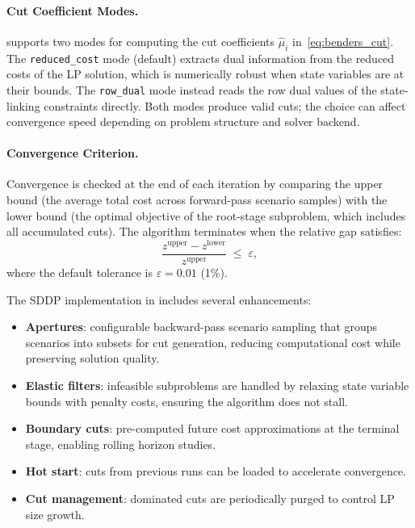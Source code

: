 \paragraph{Cut Coefficient Modes.}
\gtopt{} supports two modes for computing the cut coefficients
$\hat{\mu}_i$ in~\eqref{eq:benders_cut}.  The \texttt{reduced\_cost}
mode (default) extracts dual information from the reduced costs of the
LP solution, which is numerically robust when state variables are at
their bounds.  The \texttt{row\_dual} mode instead reads the row dual
values of the state-linking constraints directly.  Both modes produce
valid cuts; the choice can affect convergence speed depending on problem
structure and solver backend.

\paragraph{Convergence Criterion.}
Convergence is checked at the end of each iteration by comparing the
upper bound (the average total cost across forward-pass scenario
samples) with the lower bound (the optimal objective of the root-stage
subproblem, which includes all accumulated cuts).  The algorithm
terminates when the relative gap satisfies:
\[
  \frac{z^{\text{upper}} - z^{\text{lower}}}{z^{\text{upper}}}
  \;\leq\; \varepsilon,
\]
where the default tolerance is $\varepsilon = 0.01$ (1\%).

The SDDP implementation in \gtopt{} includes several enhancements:

\begin{itemize}
  \item \textbf{Apertures}: configurable backward-pass scenario sampling
    that groups scenarios into subsets for cut generation, reducing
    computational cost while preserving solution quality.
  \item \textbf{Elastic filters}: infeasible subproblems are handled by
    relaxing state variable bounds with penalty costs, ensuring the
    algorithm does not stall.
  \item \textbf{Boundary cuts}: pre-computed future cost approximations
    at the terminal stage, enabling rolling horizon studies.
  \item \textbf{Hot start}: cuts from previous runs can be loaded to
    accelerate convergence.
  \item \textbf{Cut management}: dominated cuts are periodically purged
    to control LP size growth.
\end{itemize}

